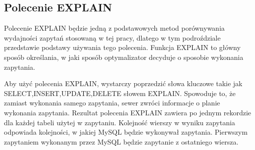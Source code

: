 \subsection{Polecenie EXPLAIN}
Polecenie EXPLAIN będzie jedną z podstawowych metod porównywania wydajności zapytań stosowaną w tej pracy, dlatego w tym podroździale przedstawie podstawy używania tego polecenia. Funkcja EXPLAIN to główny sposób określania, w jaki sposób optymalizator decyduje o sposobie wykonania zapytania.

Aby użyć polecenia EXPLAIN, wystarczy poprzedzić słowa kluczowe takie jak SELECT,INSERT,UPDATE,DELETE słowem EXPLAIN. Spowoduje to, że zamiast wykonania samego zapytania, sewer zwróci informacje o planie wykonania zapytania. Rezultat polecenia EXPLAIN zawiera po jednym rekordzie dla każdej tabeli użytej w zapytaniu. Kolejność wierszy w wyniku zapytania odpowiada kolejności, w jakiej MySQL będzie wykonywał zapytania. Pierwszym zapytaniem wykonanym przez MySQL będzie zapytanie z ostatniego wiersza.

